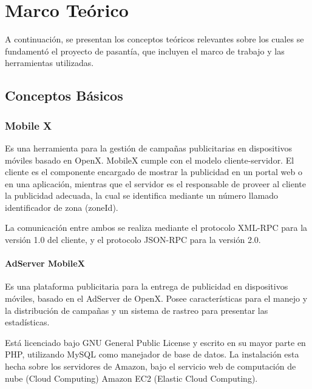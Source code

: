 
\chapter{Marco Teórico}

\thispagestyle{empty} 

A continuación, se presentan los conceptos teóricos relevantes sobre
los cuales se fundamentó el proyecto de pasantía, que incluyen el
marco de trabajo y las herramientas utilizadas.


\section{Conceptos Básicos}


\subsection{Mobile X}

Es una herramienta para la gestión de campañas publicitarias en dispositivos
móviles basado en OpenX. MobileX cumple con el modelo cliente-servidor.
El cliente es el componente encargado de mostrar la publicidad en
un portal web o en una aplicación, mientras que el servidor es el
responsable de proveer al cliente la publicidad adecuada, la cual
se identifica mediante un número llamado identificador de zona (zoneId). 

La comunicación entre ambos se realiza mediante el protocolo XML-RPC
para la versión 1.0 del cliente, y el protocolo JSON-RPC para la versión
2.0.


\subsubsection{AdServer MobileX}

Es una plataforma publicitaria para la entrega de publicidad en dispositivos
móviles, basado en el AdServer de OpenX. Posee características para
el manejo y la distribución de campañas y un sistema de rastreo para
presentar las estadísticas.

Está licenciado bajo GNU General Public License y escrito en su mayor
parte en PHP, utilizando MySQL como manejador de base de datos. La
instalación esta hecha sobre los servidores de Amazon, bajo el servicio
web de computación de nube (Cloud Computing) Amazon EC2 (Elastic Cloud
Computing).


